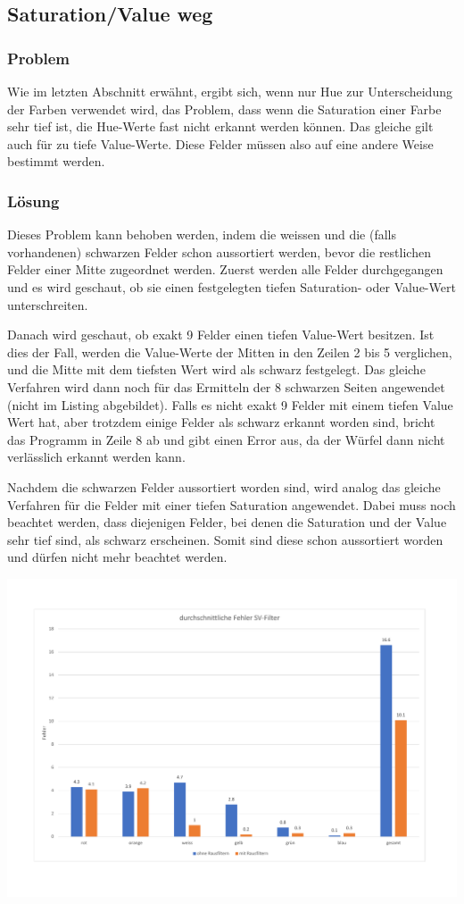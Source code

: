\documentclass[a4paper, 12pt]{article}
\begin{document}
\subsection{Saturation/Value weg}
\subsubsection{Problem}
Wie im letzten Abschnitt erwähnt, ergibt sich, wenn nur Hue zur Unterscheidung der Farben verwendet wird, das Problem, dass wenn die Saturation einer Farbe sehr tief ist, die Hue-Werte fast nicht erkannt werden können. Das gleiche gilt auch für zu tiefe Value-Werte. Diese Felder müssen also auf eine andere Weise bestimmt werden. 
\subsubsection{Lösung}
Dieses Problem kann behoben werden, indem die weissen und die (falls vorhandenen) schwarzen Felder schon aussortiert werden, bevor die restlichen Felder einer Mitte zugeordnet werden. Zuerst werden alle Felder durchgegangen und es wird geschaut, ob sie einen festgelegten tiefen Saturation- oder Value-Wert unterschreiten.

Danach wird geschaut, ob exakt 9 Felder einen tiefen Value-Wert besitzen. Ist dies der Fall, werden die Value-Werte der Mitten in den Zeilen 2 bis 5 verglichen, und die Mitte mit dem tiefsten Wert wird als schwarz festgelegt. Das gleiche Verfahren wird dann noch für das Ermitteln der 8 schwarzen Seiten angewendet (nicht im Listing abgebildet). Falls es nicht exakt 9 Felder mit einem tiefen Value Wert hat, aber trotzdem einige Felder als schwarz erkannt worden sind, bricht das Programm in Zeile 8 ab und gibt einen Error aus, da der Würfel dann nicht verlässlich erkannt werden kann. 

 Nachdem die schwarzen Felder aussortiert worden sind, wird analog das gleiche Verfahren für die Felder mit einer tiefen Saturation angewendet. Dabei muss noch beachtet werden, dass diejenigen Felder, bei denen die Saturation und der Value sehr tief sind, als schwarz erscheinen. Somit sind diese schon aussortiert worden und dürfen nicht mehr beachtet werden. 
 
\includegraphics[scale=0.4]{Fehler_SV_Filter} 
\end{document}
